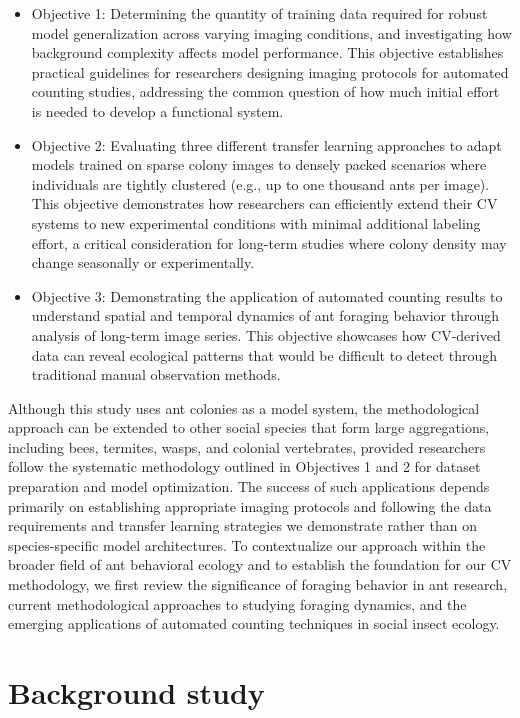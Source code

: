 \begin{itemize}
    \item Objective 1: Determining the quantity of training data required for robust model generalization across varying imaging conditions, and investigating how background complexity affects model performance. This objective establishes practical guidelines for researchers designing imaging protocols for automated counting studies, addressing the common question of how much initial effort is needed to develop a functional system.
    \item Objective 2: Evaluating three different transfer learning approaches to adapt models trained on sparse colony images to densely packed scenarios where individuals are tightly clustered (e.g., up to one thousand ants per image). This objective demonstrates how researchers can efficiently extend their CV systems to new experimental conditions with minimal additional labeling effort, a critical consideration for long-term studies where colony density may change seasonally or experimentally.
    \item Objective 3: Demonstrating the application of automated counting results to understand spatial and temporal dynamics of ant foraging behavior through analysis of long-term image series. This objective showcases how CV-derived data can reveal ecological patterns that would be difficult to detect through traditional manual observation methods.
\end{itemize}

Although this study uses ant colonies as a model system, the methodological approach can be extended to other social species that form large aggregations, including bees, termites, wasps, and colonial vertebrates, provided researchers follow the systematic methodology outlined in Objectives 1 and 2 for dataset preparation and model optimization. The success of such applications depends primarily on establishing appropriate imaging protocols and following the data requirements and transfer learning strategies we demonstrate rather than on species-specific model architectures. To contextualize our approach within the broader field of ant behavioral ecology and to establish the foundation for our CV methodology, we first review the significance of foraging behavior in ant research, current methodological approaches to studying foraging dynamics, and the emerging applications of automated counting techniques in social insect ecology.

\section{Background study}

